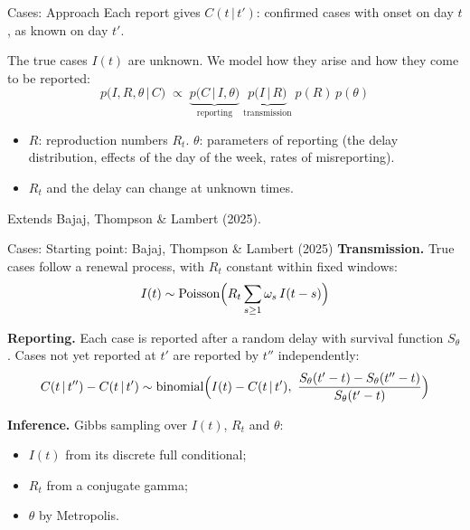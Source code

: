 \documentclass[aspectratio=169,9pt]{beamer}
\newcommand{\given}{\,|\,}
\begin{document}
\begin{frame}{Cases: Approach}
Each report gives $C(t\given t')$: confirmed cases with onset on day $t$, as
known on day $t'$.

\bigskip
The true cases $I(t)$ are unknown. We model how they arise and how they come
to be reported:
\[
p\bigl(I, R, \theta \given C\bigr)\;\propto\;
\underbrace{p\bigl(C\given I,\theta\bigr)}_{\text{reporting}}\;
\underbrace{p\bigl(I\given R\bigr)}_{\text{transmission}}\;
p(R)\,p(\theta)
\]

\bigskip
\begin{itemize}
\item $R$: reproduction numbers $R_t$. $\theta$: parameters of reporting
(the delay distribution, effects of the day of the week, rates of misreporting).
\item $R_t$ and the delay can change at unknown times.
\end{itemize}

\bigskip
{\small Extends Bajaj, Thompson \& Lambert (2025).}
\end{frame}

\begin{frame}{Cases: Starting point: Bajaj, Thompson \& Lambert (2025)}
\textbf{Transmission.} True cases follow a renewal process, with $R_t$
constant within fixed windows:
\[
I(t)\sim\operatorname{Poisson}\Bigl(R_t\sum_{s\ge 1}\omega_s\,I(t-s)\Bigr)
\]

\textbf{Reporting.} Each case is reported after a random delay with survival
function $S_\theta$. Cases not yet reported at $t'$ are reported by $t''$
independently:
\[
C(t\given t'')-C(t\given t')\sim
\operatorname{binomial}\Bigl(I(t)-C(t\given t'),\
\frac{S_\theta(t'-t)-S_\theta(t''-t)}{S_\theta(t'-t)}\Bigr)
\]

\textbf{Inference.} Gibbs sampling over $I(t)$, $R_t$ and $\theta$:
\begin{itemize}
\item $I(t)$ from its discrete full conditional;
\item $R_t$ from a conjugate gamma;
\item $\theta$ by Metropolis.
\end{itemize}
\end{frame}
\end{document}
